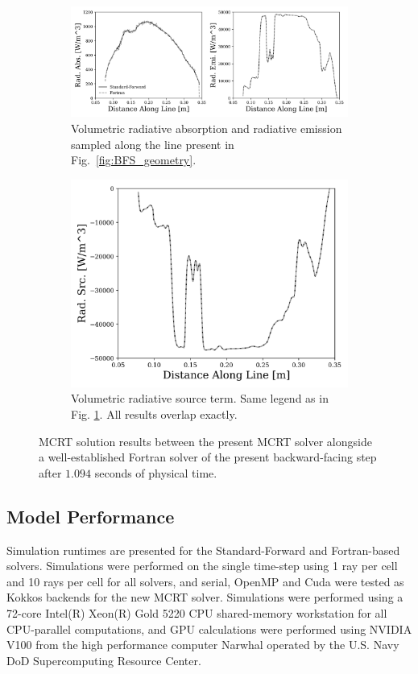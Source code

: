 \begin{figure}
  \begin{subfigure}{1\textwidth}
  \centering
  \includegraphics[width=1.0\linewidth]{figures/ch4/BFS_results_top.png}
  \caption{Volumetric radiative absorption and radiative emission sampled along the line present in Fig.~\ref{fig:BFS_geometry}.}
  \label{fig:BFS_RadAbsEmi}
  \end{subfigure}
  \begin{subfigure}{1\textwidth}
  \centering
  \includegraphics[width=0.55\linewidth]{figures/ch4/BFS_results_bottom.png}
  \caption{Volumetric radiative source term. Same legend as in Fig. \ref{fig:BFS_RadAbsEmi}. All results overlap exactly.}
  \label{fig:BFS_RadSrc}
  \end{subfigure}
  \caption{MCRT solution results between the present MCRT solver alongside a well-established Fortran solver of the present backward-facing step after $1.094$ seconds of physical time.}
  \label{fig:BFS_contours}
\end{figure}



\subsection{Model Performance}
Simulation runtimes are presented for the Standard-Forward and Fortran-based solvers. Simulations were performed on the single time-step using 1 ray per cell and 10 rays per cell for all solvers, and serial, OpenMP and Cuda were tested as Kokkos backends for the new MCRT solver. 
Simulations were performed using a 72-core Intel(R) Xeon(R) Gold 5220 CPU shared-memory workstation for all CPU-parallel computations, and GPU calculations were performed using NVIDIA V100 from the high performance computer Narwhal operated by the U.S. Navy DoD Supercomputing Resource Center.

